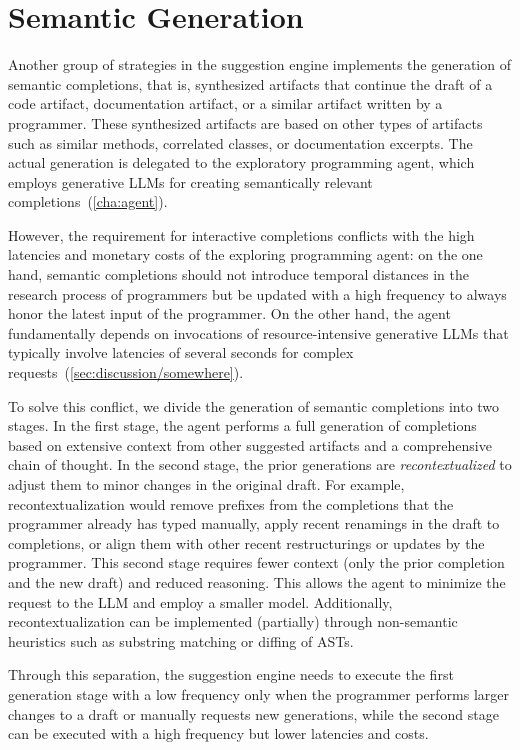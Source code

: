 
\section{Semantic Generation}
\label{sec:suggestions/generation}

Another group of strategies in the suggestion engine implements the generation of semantic completions, that is, synthesized artifacts that continue the draft of a code artifact, documentation artifact, or a similar artifact written by a programmer.
These synthesized artifacts are based on other types of artifacts such as similar methods, correlated classes, or documentation excerpts.
The actual generation is delegated to the exploratory programming agent, which employs generative LLMs for creating semantically relevant completions~(\cref{cha:agent}).

However, the requirement for interactive completions conflicts with the high latencies and monetary costs of the exploring programming agent:
on the one hand, semantic completions should not introduce temporal distances in the research process of programmers but be updated with a high frequency to always honor the latest input of the programmer.
On the other hand, the agent fundamentally depends on invocations of resource-intensive generative LLMs that typically involve latencies of several seconds for complex requests~(\cref{sec:discussion/somewhere}).

To solve this conflict, we divide the generation of semantic completions into two stages.
In the first stage, the agent performs a full generation of completions based on extensive context from other suggested artifacts and a comprehensive chain of thought.
In the second stage, the prior generations are \emph{recontextualized} to adjust them to minor changes in the original draft.
For example, recontextualization would remove prefixes from the completions that the programmer already has typed manually, apply recent renamings in the draft to completions, or align them with other recent restructurings or updates by the programmer.
This second stage requires fewer context (only the prior completion and the new draft) and reduced reasoning.
This allows the agent to minimize the request to the LLM and employ a smaller model.
Additionally, recontextualization can be implemented (partially) through non-semantic heuristics such as substring matching or diffing of ASTs.

Through this separation, the suggestion engine needs to execute the first generation stage with a low frequency only when the programmer performs larger changes to a draft or manually requests new generations, while the second stage can be executed with a high frequency but lower latencies and costs.

